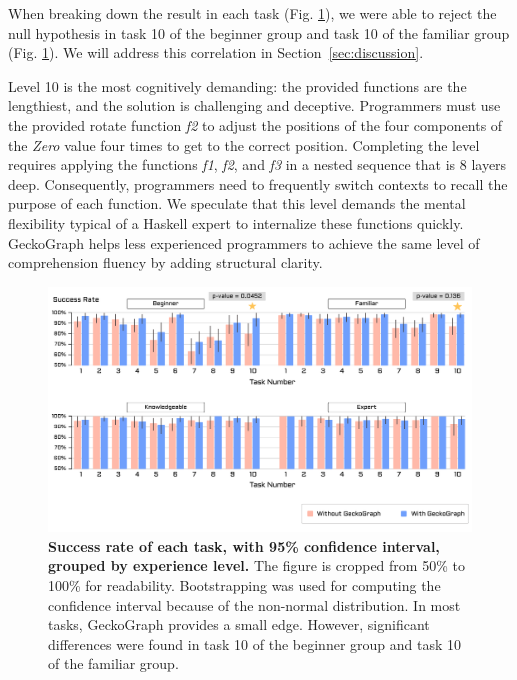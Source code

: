 \documentclass[preprint,12pt]{elsarticle}
\begin{document}
When breaking down the result in each task (Fig. \ref{fig:success-rate}), we were able to reject the null hypothesis in task 10 of the beginner group and task 10 of the familiar group (Fig. \ref{fig:success-rate}). We will address this correlation in Section~\ref{sec:discussion}.

Level 10 is the most cognitively demanding: the provided functions are the lengthiest, and the solution is challenging and deceptive. Programmers must use the provided rotate function {\it f2} to adjust the positions of the four components of the {\it Zero} value four times to get to the correct position. Completing the level requires applying the functions {\it f1}, {\it f2}, and {\it f3} in a nested sequence that is 8 layers deep. Consequently, programmers need to frequently switch contexts to recall the purpose of each function. We speculate that this level demands the mental flexibility typical of a Haskell expert to internalize these functions quickly. GeckoGraph helps less experienced programmers to achieve the same level of comprehension fluency by adding structural clarity.

\begin{figure}[ht]
  \includegraphics[width=\linewidth]{figures/SuccessfulRate}
  \caption{\label{fig:success-rate}{\bf Success rate of each task, with 95\% confidence interval, grouped by experience level.} The figure is cropped from 50\% to 100\% for readability. Bootstrapping was used for computing the confidence interval because of the non-normal distribution. In most tasks, GeckoGraph provides a small edge. However, significant differences were found in task 10 of the beginner group and task 10 of the familiar group. }
\end{figure}
\end{document}
